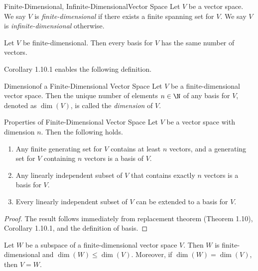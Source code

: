 \documentclass[linearalgebraI]{subfiles}
\begin{document}
    \begin{definition}{Finite-Dimensional, Infinite-Dimensional}{Vector Space}
        Let $V$ be a vector space. We say $V$ is \emph{finite-dimensional} if there exists a finite spanning set for $V$. We say $V$ is \emph{infinite-dimensional} otherwise.
    \end{definition}

    \begin{cor}{}
        Let $V$ be finite-dimensional. Then every basis for $V$ has the same number of vectors.
    \end{cor}	

    \begin{remark}
        Corollary 1.10.1 enables the following definition.
    \end{remark}

    \begin{definition}{Dimension}{of a Finite-Dimensional Vector Space}
        Let $V$ be a finite-dimensional vector space. Then the unique number of elements $n\in\N$ of any basis for $V$, denoted as $\dim(V)$, is called the \emph{dimension} of $V$.
    \end{definition}

    \begin{prop}{Properties of Finite-Dimensional Vector Space}
        Let $V$ be a vector space with dimension $n$. Then the following holds.
        \begin{enumerate}
            \item Any finite generating set for $V$ contains at least $n$ vectors, and a generating set for $V$ containing $n$ vectors is a basis of $V$.
            \item Any linearly independent subset of $V$ that contains exactly $n$ vectors is a basis for $V$.
            \item Every linearly independent subset of $V$ can be extended to a basis for $V$.
        \end{enumerate}
    \end{prop}

    \begin{proof}
        The result follows immediately from replacement theorem (Theorem 1.10), Corollary 1.10.1, and the definition of basis.
    \end{proof}

    \begin{prop}{}
        Let $W$ be a subspace of a finite-dimensional vector space $V$. Then $W$ is finite-dimensional and $\dim(W)\leq \dim(V)$. Moreover, if $\dim(W) = \dim(V)$, then $V=W$.
    \end{prop}
\end{document}
